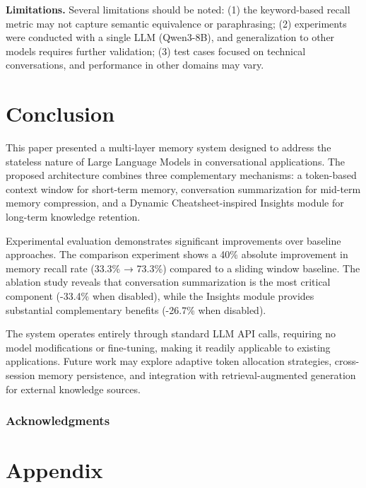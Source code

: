 \documentclass{article} %
\begin{document}
\textbf{Limitations.} Several limitations should be noted: (1) the keyword-based recall metric may not capture semantic equivalence or paraphrasing; (2) experiments were conducted with a single LLM (Qwen3-8B), and generalization to other models requires further validation; (3) test cases focused on technical conversations, and performance in other domains may vary.

\section{Conclusion}
\label{sec:conclusion}

This paper presented a multi-layer memory system designed to address the stateless nature of Large Language Models in conversational applications. The proposed architecture combines three complementary mechanisms: a token-based context window for short-term memory, conversation summarization for mid-term memory compression, and a Dynamic Cheatsheet-inspired Insights module for long-term knowledge retention.

Experimental evaluation demonstrates significant improvements over baseline approaches. The comparison experiment shows a 40\% absolute improvement in memory recall rate (33.3\% → 73.3\%) compared to a sliding window baseline. The ablation study reveals that conversation summarization is the most critical component (-33.4\% when disabled), while the Insights module provides substantial complementary benefits (-26.7\% when disabled).

The system operates entirely through standard LLM API calls, requiring no model modifications or fine-tuning, making it readily applicable to existing applications. Future work may explore adaptive token allocation strategies, cross-session memory persistence, and integration with retrieval-augmented generation for external knowledge sources.

\subsubsection*{Acknowledgments}





\appendix
\section{Appendix}
\end{document}
